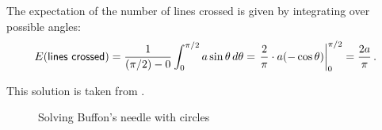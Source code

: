 The expectation of the number of lines crossed is given by integrating over possible angles:
\begin{equation}\label{eq.buffon-integral}
E(\textsf{lines crossed}) =
  \displaystyle\frac{1}{(\pi/2)-0} \int_0^{\pi/2} a\sin \theta\,
  d\theta=\left.\displaystyle\frac{2}{\pi}\cdot a (-\cos \theta)
  \right|_0^{\pi/2}=\displaystyle\frac{2a}{\pi}\,.
\end{equation}

 This solution is taken from \cite[Chapter~26]{proofs}.

\begin{figure}[tb]
\begin{center}
\end{center}
\caption{Solving Buffon's needle with circles}\label{f.buffon3}
\end{figure}

